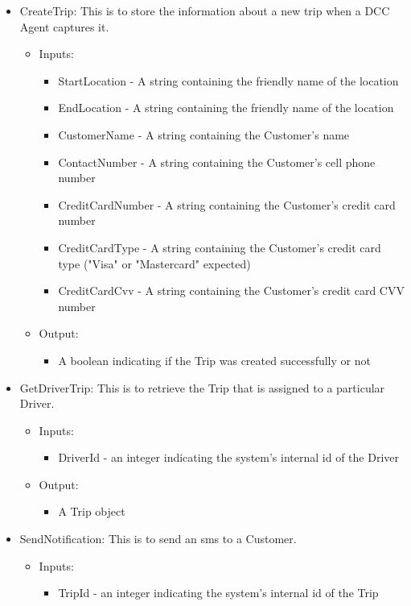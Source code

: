 \documentclass[10pt, onecolumn]{witseiepaper}
\begin{document}
\begin{itemize}
\item CreateTrip: This is to store the information about a new trip when a DCC Agent captures it.
	\begin{itemize}
	\item Inputs:
		\begin{itemize}
		\item StartLocation - A string containing the friendly name of the location
		\item EndLocation - A string containing the friendly name of the location
		\item CustomerName - A string containing the Customer's name
		\item ContactNumber - A string containing the Customer's cell phone number
		\item CreditCardNumber - A string containing the Customer's credit card number
		\item CreditCardType - A string containing the Customer's credit card type ("Visa" or "Mastercard" expected)
		\item CreditCardCvv - A string containing the Customer's credit card CVV number
		\end{itemize}
	\item Output:
		\begin{itemize}
		\item A boolean indicating if the Trip was created successfully or not
		\end{itemize}
	\end{itemize}
\item GetDriverTrip: This is to retrieve the Trip that is assigned to a particular Driver.
	\begin{itemize}
	\item Inputs:
		\begin{itemize}
		\item DriverId - an integer indicating the system's internal id of the Driver
		\end{itemize}
	\item Output:
		\begin{itemize}
		\item A Trip object
		\end{itemize}
	\end{itemize}
\item SendNotification: This is to send an sms to a Customer.
	\begin{itemize}
	\item Inputs:
		\begin{itemize}
		\item TripId - an integer indicating the system's internal id of the Trip

\end{itemize}
\end{itemize}
\end{itemize}
\end{document}
